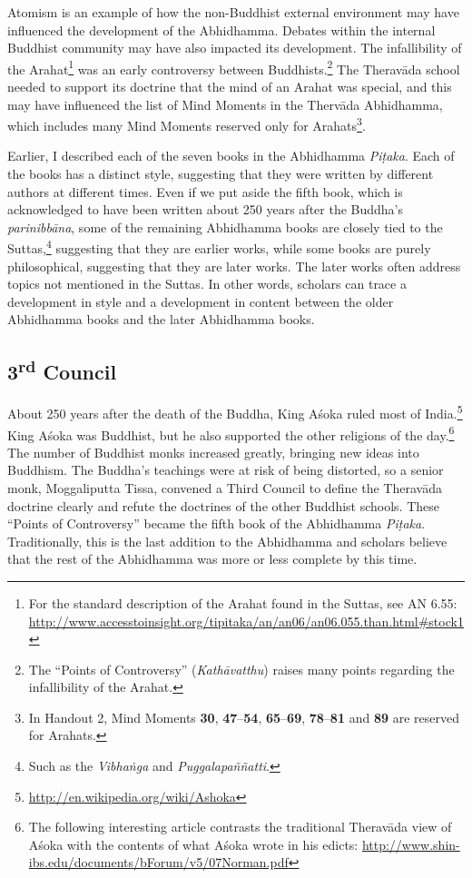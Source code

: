 Atomism is an example of how the non-Buddhist external environment may have influenced the development of the Abhidhamma. Debates within the internal Buddhist community may have also impacted its development. The infallibility of the Arahat\footnote{For the standard description of the Arahat found in the Suttas, see AN 6.55: \url{http://www.accesstoinsight.org/tipitaka/an/an06/an06.055.than.html\#stock1}} was an early controversy between Buddhists.\footnote{The “Points of Controversy” (\textit{Kathāvatthu}) raises many points regarding the infallibility of the Arahat.} The Theravāda school needed to support its doctrine that the mind of an Arahat was special, and this may have influenced the list of Mind Moments in the Thervāda Abhidhamma, which includes many Mind Moments reserved only for Arahats\footnote{In Handout 2, Mind Moments \textbf{30}, \textbf{47}--\textbf{54}, \textbf{65}--\textbf{69}, \textbf{78}--\textbf{81} and \textbf{89} are reserved for Arahats.}.

Earlier, I described each of the seven books in the Abhidhamma \textit{Piṭaka}. Each of the books has a distinct style, suggesting that they were written by different authors at different times. Even if we put aside the fifth book, which is acknowledged to have been written about 250 years after the Buddha’s \textit{parinibbāna}, some of the remaining Abhidhamma books are closely tied to the Suttas,\footnote{Such as the \textit{Vibhaṅga} and \textit{Puggalapaññatti}.} suggesting that they are earlier works, while some books are purely philosophical, suggesting that they are later works. The later works often address topics not mentioned in the Suttas. In other words, scholars can trace a development in style and a development in content between the older Abhidhamma books and the later Abhidhamma books.

\pagebreak

\subsection*{3\textsuperscript{rd} Council}

About 250 years after the death of the Buddha, King Aśoka ruled most of India.\footnote{\url{http://en.wikipedia.org/wiki/Ashoka}} King Aśoka was Buddhist, but he also supported the other religions of the day.\footnote{The following interesting article contrasts the traditional Theravāda view of Aśoka with the contents of what Aśoka wrote in his edicts: \url{http://www.shin-ibs.edu/documents/bForum/v5/07Norman.pdf}} The number of Buddhist monks increased greatly, bringing new ideas into Buddhism. The Buddha’s teachings were at risk of being distorted, so a senior monk, Moggaliputta Tissa, convened a Third Council to define the Theravāda doctrine clearly and refute the doctrines of the other Buddhist schools. These “Points of Controversy” became the fifth book of the Abhidhamma \textit{Piṭaka}. Traditionally, this is the last addition to the Abhidhamma and scholars believe that the rest of the Abhidhamma was more or less complete by this time.

